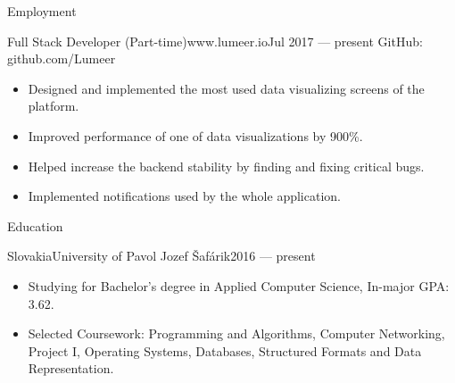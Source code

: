 \documentclass[]{mcdowellcv}
\begin{document}
	\makeheader
	
	\begin{cvsection}{Employment}
		\begin{cvsubsection}{Full Stack Developer (Part-time)}{www.lumeer.io}{Jul 2017 — present}
			GitHub: github.com/Lumeer
			\begin{itemize}
				\item Designed and implemented the most used data visualizing screens of the platform.
				\item Improved performance of one of data visualizations by 900\%.
				\item Helped increase the backend stability by finding and fixing critical bugs.
				\item Implemented notifications used by the whole application.
			\end{itemize}
		\end{cvsubsection}
	\end{cvsection}
	
	\begin{cvsection}{Education}
		\begin{cvsubsection}{Slovakia}{University of Pavol Jozef Šafárik}{2016 — present}
			\begin{itemize}
				\item Studying for Bachelor's degree in Applied Computer Science, In-major GPA: 3.62.
				\item Selected Coursework: Programming and Algorithms, Computer Networking, Project I, Operating Systems, Databases, Structured Formats and Data Representation.
			\end{itemize}
		\end{cvsubsection}
	\end{cvsection}
	
\end{document}
